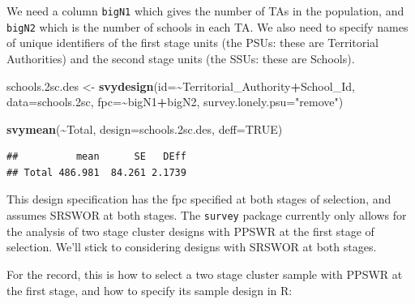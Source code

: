 \documentclass[
]{book}
\newenvironment{Shaded}{\begin{snugshade}}{\end{snugshade}}
\newcommand{\AttributeTok}[1]{\textcolor[rgb]{0.13,0.29,0.53}{#1}}
\newcommand{\ConstantTok}[1]{\textcolor[rgb]{0.56,0.35,0.01}{#1}}
\newcommand{\FloatTok}[1]{\textcolor[rgb]{0.00,0.00,0.81}{#1}}
\newcommand{\FunctionTok}[1]{\textcolor[rgb]{0.13,0.29,0.53}{\textbf{#1}}}
\newcommand{\NormalTok}[1]{#1}
\newcommand{\OtherTok}[1]{\textcolor[rgb]{0.56,0.35,0.01}{#1}}
\newcommand{\SpecialCharTok}[1]{\textcolor[rgb]{0.81,0.36,0.00}{\textbf{#1}}}
\newcommand{\StringTok}[1]{\textcolor[rgb]{0.31,0.60,0.02}{#1}}
\begin{document}
We need a column \texttt{bigN1} which gives the number of TAs in the population, and
\texttt{bigN2} which is the number of schools in each TA. We also need to specify names
of unique identifiers of the first stage units (the PSUs: these are Territorial Authorities)
and the second stage units (the SSUs: these are Schools).

\begin{Shaded}
\begin{Highlighting}[]
\NormalTok{schools}\FloatTok{.2}\NormalTok{sc.des }\OtherTok{\textless{}{-}} \FunctionTok{svydesign}\NormalTok{(}\AttributeTok{id=}\SpecialCharTok{\textasciitilde{}}\NormalTok{Territorial\_Authority}\SpecialCharTok{+}\NormalTok{School\_Id, }\AttributeTok{data=}\NormalTok{schools}\FloatTok{.2}\NormalTok{sc, }
                             \AttributeTok{fpc=}\SpecialCharTok{\textasciitilde{}}\NormalTok{bigN1}\SpecialCharTok{+}\NormalTok{bigN2,}
                             \AttributeTok{survey.lonely.psu=}\StringTok{"remove"}\NormalTok{)}
\end{Highlighting}
\end{Shaded}

\begin{Shaded}
\begin{Highlighting}[]
\FunctionTok{svymean}\NormalTok{(}\SpecialCharTok{\textasciitilde{}}\NormalTok{Total, }\AttributeTok{design=}\NormalTok{schools}\FloatTok{.2}\NormalTok{sc.des, }\AttributeTok{deff=}\ConstantTok{TRUE}\NormalTok{)}
\end{Highlighting}
\end{Shaded}

\begin{verbatim}
##          mean      SE   DEff
## Total 486.981  84.261 2.1739
\end{verbatim}

This design specification has the fpc specified at both stages of selection,
and assumes SRSWOR at both stages. The \texttt{survey} package currently only allows for the analysis
of two stage cluster designs with PPSWR at the first stage of selection. We'll stick
to considering designs with SRSWOR at both stages.

For the record, this is how to select a two stage cluster sample with PPSWR at the
first stage, and how to specify its sample design in R:
\end{document}
